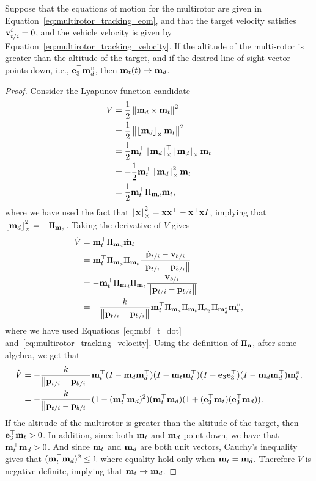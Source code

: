 \begin{theorem}
	Suppose that the equations of motion for the multirotor are given in Equation~\eqref{eq:multirotor_tracking_eom}, and that the target velocity satisfies $\mathbf{v}_{t/i}^i=0$, and the vehicle velocity is given by Equation~\eqref{eq:multirotor_tracking_velocity}.
	If the altitude of the multi-rotor is greater than the altitude of the target, and if the desired line-of-sight vector points down, i.e., $\mathbf{e}_3^\top \mathbf{m}_d^v$, 	
	then $\mathbf{m}_t(t) \to \mathbf{m}_d$.
	
\end{theorem}
\begin{proof}
	Consider the Lyapunov function candidate
	\begin{align*}
		V &= \frac{1}{2} \left\|\mathbf{m}_d \times \mathbf{m}_t\right\|^2 \\
	  	&= \frac{1}{2} \left\|\left\lfloor\mathbf{m}_d\right\rfloor_{\times} \mathbf{m}_t\right\|^2 \\
	  	&= \frac{1}{2} \mathbf{m}_t^\top \left\lfloor\mathbf{m}_d\right\rfloor_{\times}^\top \left\lfloor\mathbf{m}_d\right\rfloor_{\times} \mathbf{m}_t \\
	  	&= -\frac{1}{2} \mathbf{m}_t^\top \left\lfloor\mathbf{m}_d\right\rfloor_{\times}^2 \mathbf{m}_t \\ 
	  	&= \frac{1}{2} \mathbf{m}_t^\top \Pi_{\mathbf{m}_d} \mathbf{m}_t,
	\end{align*}
	where we have used the fact that $\left\lfloor\mathbf{x}\right\rfloor_{\times}^2 = \mathbf{x}\mathbf{x}^\top - \mathbf{x}^\top\mathbf{x} I$, implying that $\left\lfloor\mathbf{m}_d\right\rfloor_{\times}^2 = -\Pi_{\mathbf{m}_d}$.  
	Taking the derivative of $V$ gives
	\begin{align*}
		\dot{V} &= \mathbf{m}_t^\top \Pi_{\mathbf{m}_d} \dot{\mathbf{m}}_t \\
			    &= \mathbf{m}_t^\top \Pi_{\mathbf{m}_d} \Pi_{\mathbf{m}_t} \frac{\dot{\mathbf{p}}_{t/i} - \mathbf{v}_{b/i}}{\left\|\mathbf{p}_{t/i} - \mathbf{p}_{b/i}\right\|} \\
			    &= -\mathbf{m}_t^\top \Pi_{\mathbf{m}_d} \Pi_{\mathbf{m}_t} \frac{\mathbf{v}_{b/i}}{\left\|\mathbf{p}_{t/i} - \mathbf{p}_{b/i}\right\|} \\
			    &= -\frac{k}{\left\|\mathbf{p}_{t/i} - \mathbf{p}_{b/i}\right\|}\mathbf{m}_t^\top \Pi_{\mathbf{m}_d} \Pi_{\mathbf{m}_t} \Pi_{\mathbf{e}_3} \Pi_{\mathbf{m}_d^v} \mathbf{m}_t^v,
	\end{align*}
	where we have used Equations~\eqref{eq:mbf_t_dot} and~\eqref{eq:multirotor_tracking_velocity}.
	Using the definition of $\Pi_{\mathbf{n}}$, after some algebra, we get that
	\begin{align*}
		\dot{V} &=  -\frac{k}{\left\|\mathbf{p}_{t/i} - \mathbf{p}_{b/i}\right\|} \mathbf{m}_t^\top (I-\mathbf{m}_d\mathbf{m}_d^\top) (I-\mathbf{m}_t\mathbf{m}_t^\top) (I-\mathbf{e}_3\mathbf{e}_3^\top) (I-\mathbf{m}_d\mathbf{m}_d^\top)  \mathbf{m}_t^v, \\
				&= -\frac{k}{\left\|\mathbf{p}_{t/i} - \mathbf{p}_{b/i}\right\|} (1-(\mathbf{m}_t^\top\mathbf{m}_d)^2)(\mathbf{m}_t^\top \mathbf{m}_d)(1+(\mathbf{e}_3^\top \mathbf{m}_t)(\mathbf{e}_3^\top \mathbf{m}_d)).  
	\end{align*}
	If the altitude of the multirotor is greater than the altitude of the target, then $\mathbf{e}_3^\top \mathbf{m}_t > 0$.   In addition, since both $\mathbf{m}_t$ and $\mathbf{m}_d$ point down, we have that $\mathbf{m}_t^\top \mathbf{m}_d > 0$.  And since $\mathbf{m}_t$ and $\mathbf{m}_d$ are both unit vectors, Cauchy's inequality gives that $(\mathbf{m}_t^\top \mathbf{m}_d)^2 \leq 1$ where equality hold only when $\mathbf{m}_t=\mathbf{m}_d$.  Therefore $\dot{V}$ is negative definite, implying that $\mathbf{m}_t \to \mathbf{m}_d$.  
	
\end{proof}



